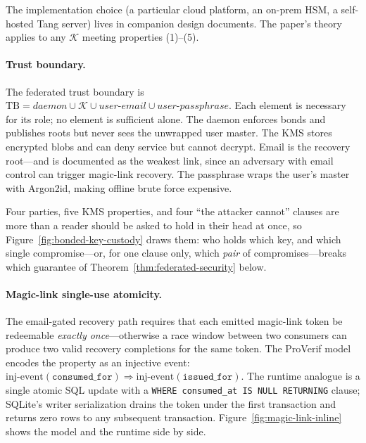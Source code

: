 \documentclass[11pt,a4paper]{article}
\theoremstyle{definition}
\theoremstyle{remark}
\begin{document}
The implementation choice (a particular cloud platform, an on-prem HSM, a self-hosted Tang server) lives in companion design documents. The paper's theory applies to any $\mathcal{K}$ meeting properties (1)--(5).

\paragraph{Trust boundary.} The federated trust boundary is
$\mathrm{TB} = \mathit{daemon} \cup \mathcal{K} \cup \mathit{user{\text{-}}email} \cup \mathit{user{\text{-}}passphrase}$.
Each element is necessary for its role; no element is sufficient alone. The daemon enforces bonds and publishes roots but never sees the unwrapped user master. The KMS stores encrypted blobs and can deny service but cannot decrypt. Email is the recovery root---and is documented as the weakest link, since an adversary with email control can trigger magic-link recovery. The passphrase wraps the user's master with Argon2id, making offline brute force expensive.

Four parties, five KMS properties, and four ``the attacker cannot'' clauses are more than a reader should be asked to hold in their head at once, so Figure~\ref{fig:bonded-key-custody} draws them: who holds which key, and which single compromise---or, for one clause only, which \emph{pair} of compromises---breaks which guarantee of Theorem~\ref{thm:federated-security} below.



\paragraph{Magic-link single-use atomicity.} The email-gated recovery path requires that each emitted magic-link token be redeemable \emph{exactly once}---otherwise a race window between two consumers can produce two valid recovery completions for the same token. The ProVerif model encodes the property as an injective event: $\mathrm{inj\text{-}event}(\texttt{consumed\_for}) \Rightarrow \mathrm{inj\text{-}event}(\texttt{issued\_for})$. The runtime analogue is a single atomic SQL update with a \texttt{WHERE consumed\_at IS NULL RETURNING} clause; SQLite's writer serialization drains the token under the first transaction and returns zero rows to any subsequent transaction. Figure~\ref{fig:magic-link-inline} shows the model and the runtime side by side.


\end{document}
